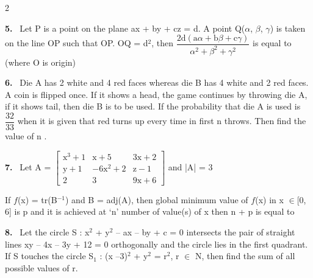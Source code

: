 \documentclass[10pt]{extarticle}
\newcommand{\qn}[1]{\par\smallskip\noindent\textbf{#1.}~}
\begin{document}
\begin{multicols}{2}
\qn{5} Let P is a point on the plane ax + by + cz = d. A point Q($\alpha$, $\beta$, $\gamma$) is taken on the line OP such that OP. OQ = d$^2$, then $\dfrac{2\text{d}(\text{a}\alpha+\text{b}\beta+\text{c}\gamma)}{\alpha^2+\beta^2+\gamma^2}$ is equal to (where O is origin)
\qn{6} Die A has 2 white and 4 red faces whereas die B has 4 white and 2 red faces. A coin is flipped once. If it shows a head, the game continues by throwing die A, if it shows tail, then die B is to be used. If the probability that die A is used is $\dfrac{32}{33}$ when it is given that red turns up every time in first n throws. Then find the value of n \underline{\hspace{1.2cm}}.
\qn{7} Let A = $\begin{bmatrix}\text{x}^3+1&\text{x}+5&3\text{x}+2\\ \text{y}+1&-6\text{x}^2+2&\text{z}-1\\ 2&3&9\text{x}+6\end{bmatrix}$ and |A| = 3\par
If $f$(x) = tr(B$^{-1}$) and B = adj(A), then global minimum value of $f$(x) in x $\in$[0, 6] is p and it is achieved at `n' number of value(s) of x then n + p is equal to
\qn{8} Let the circle S : x$^2$ + y$^2$ -- ax -- by + c = 0 intersects the pair of straight lines xy -- 4x -- 3y + 12 = 0 orthogonally and the circle lies in the first quadrant. If S touches the circle S$_1$ : (x --3)$^2$ + y$^2$ = r$^2$, r $\in$ N, then find the sum of all possible values of r.
\end{multicols}
\end{document}
